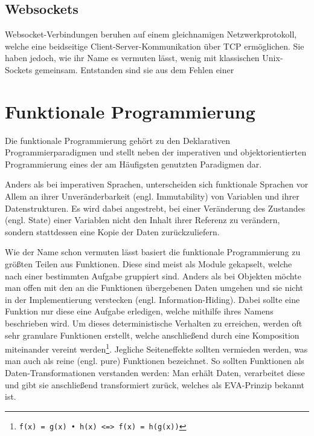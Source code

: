 \subsection{Websockets}
Websocket-Verbindungen beruhen auf einem gleichnamigen Netzwerkprotokoll, welche eine beidseitige Client-Server-Kommunikation über \acs{TCP} ermöglichen.
Sie haben jedoch, wie ihr Name es vermuten lässt, wenig mit klassischen Unix-Sockets gemeinsam.
Entstanden sind sie aus dem Fehlen einer 

\section{Funktionale Programmierung}
Die funktionale Programmierung gehört zu den Deklarativen Programmierparadigmen und stellt neben der imperativen und objektorientierten Programmierung eines der am Häufigsten genutzten Paradigmen dar.
\par
Anders als bei imperativen Sprachen, unterscheiden sich funktionale Sprachen vor Allem an ihrer Unveränderbarkeit (engl. Immutability) von Variablen und ihrer Datenstrukturen.
Es wird dabei angestrebt, bei einer Veränderung des Zustandes (engl. State) einer Variablen nicht den Inhalt ihrer Referenz zu verändern, sondern stattdessen eine Kopie der Daten zurückzuliefern.
\par
Wie der Name schon vermuten lässt basiert die funktionale Programmierung zu größten Teilen aus Funktionen. 
Diese sind meist als Module gekapselt, welche nach einer bestimmten Aufgabe gruppiert sind. 
Anders als bei Objekten möchte man offen mit den an die Funktionen übergebenen Daten umgehen und sie nicht in der Implementierung verstecken (engl. Information-Hiding). 
Dabei sollte eine Funktion nur diese eine Aufgabe erledigen, welche mithilfe ihres Namens beschrieben wird. 
Um dieses deterministische Verhalten zu erreichen, werden oft sehr granulare Funktionen erstellt, welche anschließend durch eine Komposition miteinander vereint werden\footnote{\texttt{f(x) = g(x) • h(x) <=> f(x) = h(g(x))}}.
Jegliche Seiteneffekte sollten vermieden werden, was man auch als reine (engl. pure) Funktionen bezeichnet.
So sollten Funktionen als Daten-Transformationen verstanden werden: Man erhält Daten, verarbeitet diese und gibt sie anschließend transformiert zurück, welches als \ac{EVA}-Prinzip bekannt ist.
